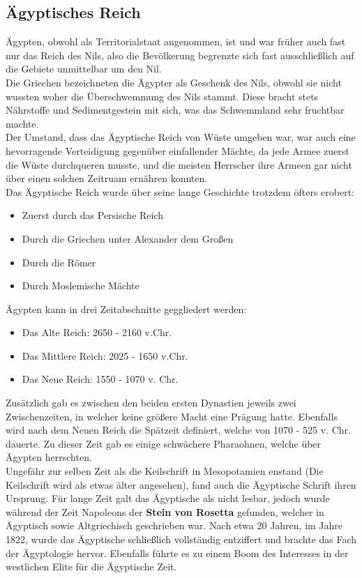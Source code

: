 \documentclass{article}
\begin{document}
	\subsection{Ägyptisches Reich}
	Ägypten, obwohl als Territorialstaat angenommen, ist und war früher auch fast nur das Reich des Nils, also die Bevölkerung begrenzte sich fast ausschließlich auf die Gebiete unmittelbar um den Nil. \\
	Die Griechen bezeichneten die Ägypter als Geschenk des Nils, obwohl sie nicht wussten woher die Überschwemmung des Nils stammt. Diese bracht stets Nährstoffe und Sedimentgestein mit sich, was das Schwemmland sehr fruchtbar machte. \\
	Der Umstand, dass das Ägyptische Reich von Wüste umgeben war, war auch eine hevorragende Verteidigung gegenüber einfallender Mächte, da jede Armee zuerst die Wüste durchqueren musste, und die meisten Herrscher ihre Armeen gar nicht über einen solchen Zeitruam ernähren konnten. \\
	Das Ägyptische Reich wurde über seine lange Geschichte trotzdem öfters erobert:
	\begin{itemize}
		\item{Zuerst durch das Persische Reich}
		\item{Durch die Griechen unter Alexander dem Großen}
		\item{Durch die Römer}
		\item{Durch Moslemische Mächte}
	\end{itemize}

	Ägypten kann in drei Zeitabschnitte geggliedert werden:
	\begin{itemize}
		\item{Das Alte Reich: 2650 - 2160 v.Chr.}
		\item{Das Mittlere Reich: 2025 - 1650 v.Chr.}
		\item{Das Neue Reich: 1550 - 1070 v. Chr.}
	\end{itemize}

	Zusätzlich gab es zwischen den beiden ersten Dynastien jeweils zwei Zwischenzeiten, in welcher keine größere Macht eine Prägung hatte. Ebenfalls wird nach dem Neuen Reich die Spätzeit definiert, welche von 1070 - 525 v. Chr. dauerte. Zu dieser Zeit gab es einige schwächere Pharaohnen, welche über Ägypten herrschten. \\
	
	Ungefähr zur selben Zeit als die Keilschrift in Mesopotamien enstand (Die Keilschrift wird als etwas älter angesehen), fand auch die Ägyptische Schrift ihren Ursprung. Für lange Zeit galt das Ägyptische als nicht lesbar, jedoch wurde während der Zeit Napoleons der \textbf{Stein von Rosetta} gefunden, welcher in Ägyptisch sowie Altgriechisch geschrieben war. Nach etwa 20 Jahren, im Jahre 1822, wurde das Ägyptische schließlich vollständig entziffert und brachte das Fach der Ägyptologie hervor. Ebenfalls führte es zu einem Boom des Interesses in der westlichen Elite für die Ägyptische Zeit. \\
	
\end{document}
